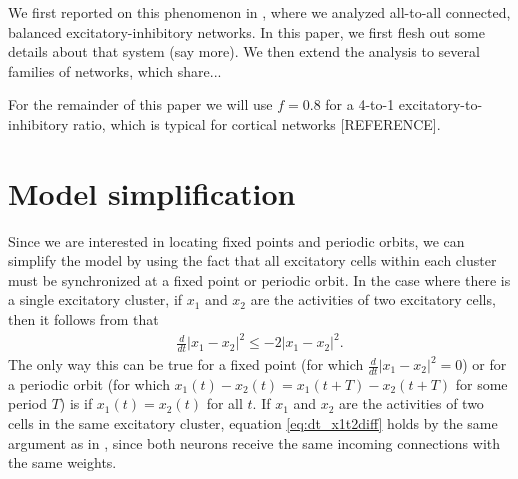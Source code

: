 \documentclass[11pt,reqno]{amsart}
\begin{document}
We first reported on this phenomenon in \cite{Barreiro2017}, where we analyzed all-to-all connected, balanced excitatory-inhibitory networks. In this paper, we first flesh out some details about that system (say more). We then extend the analysis to several families of networks, which share...

For the remainder of this paper we will use $f = 0.8$ for a 4-to-1 excitatory-to-inhibitory ratio, which is typical for cortical networks [REFERENCE].

\section{Model simplification}\label{sec:simplermodel}

Since we are interested in locating fixed points and periodic orbits, we can simplify the model by using the fact that all excitatory cells within each cluster must be synchronized at a fixed point or periodic orbit. In the case where there is a single excitatory cluster, if $x_1$ and $x_2$ are the activities of two excitatory cells, then it follows from \cite{Barreiro2017} that
\begin{align}\label{eq:dt_x1t2diff}
\frac{d}{dt}|x_1 - x_2|^2 \leq -2 |x_1 - x_2 |^2.
\end{align}
The only way this can be true for a fixed point (for which $\frac{d}{dt} |x_1 - x_2|^2 =0$) or for a periodic orbit (for which $x_1(t)-x_2(t) = x_1(t+T)-x_2(t+T)$ for some period $T$) is if $x_1(t) = x_2(t)$ for all $t$. If $x_1$ and $x_2$ are the activities of two cells in the same excitatory cluster, equation \cref{eq:dt_x1t2diff} holds by the same argument as in \cite{Barreiro2017}, since both neurons receive the same incoming connections with the same weights. 
\end{document}
